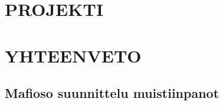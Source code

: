 \chapter{PROJEKTI}
\label{ch:projekti}


\chapter{YHTEENVETO}
\label{ch:yhteenveto}



\printbibliography[heading=bibintoc]



\begin{appendices}

\chapter{Mafioso suunnittelu muistiinpanot}
\label{ch:mafioso-notes}


\end{appendices}


